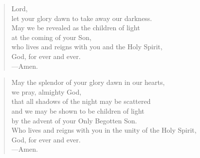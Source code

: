 \prayer

\setlength{\vleftmargin}{\prayerleftmargini}

\begin{verse}
Lord,\\
let your glory dawn to take away our darkness.\\
May we be revealed as the children of light\\
at the coming of your Son,\\
who lives and reigns with you and the Holy Spirit,\\
God, for ever and ever.\\
{\color{red}---\thinspace}Amen.
\end{verse}


\begin{verse}
May the splendor of your glory dawn in our hearts,\\
we pray, almighty God,\\
that all shadows of the night may be scattered\\
and we may be shown to be children of light\\
by the advent of your Only Begotten Son.\\
Who lives and reigns with you in the unity of the Holy Spirit,\\
God, for ever and ever.\\
{\color{red}---\thinspace}Amen.
\end{verse}

\setlength{\vleftmargin}{\defleftmargini}